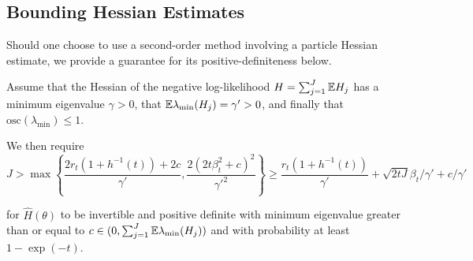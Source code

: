 \documentclass{article}
\begin{document}
\subsection{Bounding Hessian Estimates}

Should one choose to use a second-order method involving a particle Hessian estimate, we provide a guarantee for its positive-definiteness below.

\begin{lem}
    \label{lemma:hess_bound}
    Assume that the Hessian of the negative log-likelihood $H=\sum_{j=1}^J \mathbb{E} H_j$ has a minimum eigenvalue $\gamma > 0$, that $\mathbb{E} \lambda_{\min} (H_j) = \gamma' > 0$, and finally that $\text{osc}(\lambda_{\min}) \leq 1$. 
    
    We then require 
    \begin{equation}
        J > \max\left\{\frac{2r_t(1+h^{-1}(t)) + 2c}{\gamma'}, \frac{2(2t\beta_t^2+c)^2}{\gamma'^2}\right\} \geq  \frac{r_t(1+h^{-1}(t))}{\gamma'} + \sqrt{2tJ}\beta_t/\gamma' + c/\gamma'
    \end{equation}
    
    for $\hat{H}(\theta)$ to be invertible and positive definite with minimum eigenvalue greater than or equal to $c \in (0, \sum_{j=1}^J \mathbb{E}\lambda_{\min}(H_j))$ and with probability at least $1-\exp(-t)$.
\end{lem}
\end{document}
